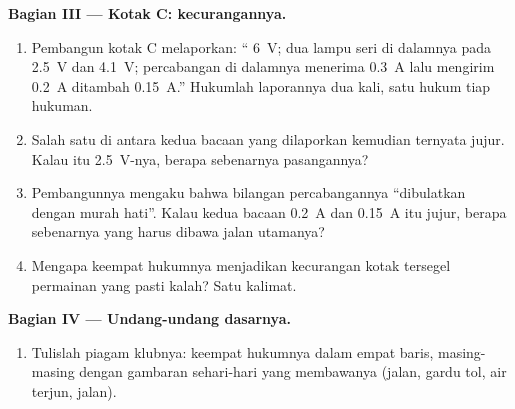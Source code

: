 \begin{problem}
\medskip\noindent\textbf{Bagian III --- Kotak C: kecurangannya.}
\begin{enumerate}[resume]
  \item Pembangun kotak C melaporkan: `` \qty{6}{V}; dua lampu
        seri di dalamnya pada \qty{2.5}{V} dan \qty{4.1}{V};
        percabangan di dalamnya menerima \qty{0.3}{A} lalu mengirim
        \qty{0.2}{A} ditambah \qty{0.15}{A}.'' Hukumlah laporannya
        dua kali, satu hukum tiap hukuman.
  \item Salah satu di antara kedua bacaan  yang dilaporkan
        kemudian ternyata jujur. Kalau itu \qty{2.5}{V}-nya, berapa
        sebenarnya pasangannya?
  \item Pembangunnya mengaku bahwa bilangan percabangannya
        ``dibulatkan dengan murah hati''. Kalau kedua bacaan 
        \qty{0.2}{A} dan \qty{0.15}{A} itu jujur, berapa sebenarnya
        yang harus dibawa jalan utamanya?
  \item Mengapa keempat hukumnya menjadikan kecurangan kotak tersegel
        permainan yang pasti kalah? Satu kalimat.
\end{enumerate}

\medskip\noindent\textbf{Bagian IV --- Undang-undang dasarnya.}
\begin{enumerate}[resume]
  \item Tulislah piagam klubnya: keempat hukumnya dalam empat baris,
        masing-masing dengan gambaran sehari-hari yang membawanya
        (jalan, gardu tol, air terjun,  jalan).
\end{enumerate}
\end{problem}
